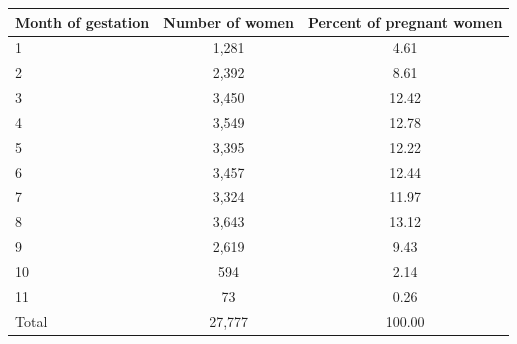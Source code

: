 \begin{tabular}{lcc} \toprule Month of gestation & Number of women & Percent of pregnant women \\ \midrule
\midrule
1                   &       1,281&        4.61\\
2                   &       2,392&        8.61\\
3                   &       3,450&       12.42\\
4                   &       3,549&       12.78\\
5                   &       3,395&       12.22\\
6                   &       3,457&       12.44\\
7                   &       3,324&       11.97\\
8                   &       3,643&       13.12\\
9                   &       2,619&        9.43\\
10                  &         594&        2.14\\
11                  &          73&        0.26\\
Total               &      27,777&      100.00\\
\bottomrule \end{tabular}
